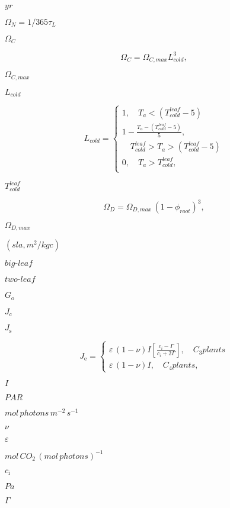 \documentclass{article}
\begin{document}
{$yr$
\pagebreak

$\Omega_N= 1/365 \tau_L$
\pagebreak

$\Omega_C$
\pagebreak

\[ \label{gamma_cold} \Omega_C = \Omega_{C,max}L_{cold}^3, \]
\pagebreak

$\Omega_{C,max}$
\pagebreak

$L_{cold}$
\pagebreak

\[ \label{cldls} L_{cold} = \begin{cases} 1, \quad T_a < \left(T_{cold}^{leaf} - 5\right) \\ 1 - \frac{T_a - \left(T_{cold}^{leaf} - 5\right)}{5}, \\ \quad T_{cold}^{leaf} > T_a > (T_{cold}^{leaf} - 5) \\ 0, \quad T_a > T_{cold}^{leaf} ,\\ \end{cases} \]
\pagebreak

$T_{cold}^{leaf}$
\pagebreak

\[ \label{gamma_dry} \Omega_{D} = \Omega_{D,max}\,(1-\phi_{root})^3, \]
\pagebreak

$\Omega_{D,max}$
\pagebreak

$(sla, m^2 /kg c)$
\pagebreak

$\textit{big-leaf}$
\pagebreak

$\textit{two-leaf}$
\pagebreak

$G_\mathrm{o}$
\pagebreak

$J_\mathrm{c}$
\pagebreak

$J_\mathrm{s}$
\pagebreak

\[ \label{J_e} J_\mathrm{e} = \begin{cases} \varepsilon\,(1-{\nu})I \left[\frac{c_{i} - \Gamma}{c_{i} + 2\Gamma}\right], \quad C_3 plants\\ \varepsilon\,(1-{\nu})I,\quad C_4 plants, \end{cases} \]
\pagebreak

$I$
\pagebreak

$PAR$
\pagebreak

$mol\,photons\,m^{-2}\,s^{-1}$
\pagebreak

${\nu}$
\pagebreak

$\varepsilon$
\pagebreak

$mol\,{CO_2}\,(mol\,photons)^{-1}$
\pagebreak

$c_\mathrm{i}$
\pagebreak

$Pa$
\pagebreak

$\Gamma$
\pagebreak

}
\end{document}
